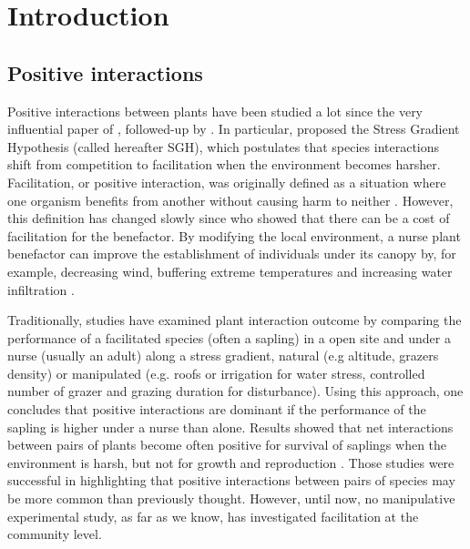 \documentclass[12pt]{article} %
\begin{document}


\section{Introduction}

\subsection{Positive interactions}
Positive interactions between plants have been studied a lot since the very influential paper of \citep{Bertness1994}, followed-up by \citep{Bruno2003}. In particular, \citet{Bertness1994} proposed the Stress Gradient Hypothesis (called hereafter SGH), which postulates that species interactions shift from competition to facilitation when the environment becomes harsher. Facilitation, or positive interaction, was originally defined as a situation where one organism benefits from another without causing harm to neither \citep{Bruno2003}. However, this definition has changed slowly since \citet{Schob2014} who showed that there can be a cost of facilitation for the benefactor.
By modifying the local environment, a nurse plant benefactor can improve the establishment of individuals under its canopy by, for example, decreasing wind, buffering extreme temperatures and increasing water infiltration \citep{Rietkerk1997}. 

Traditionally, studies have examined plant interaction outcome by comparing the performance of a facilitated species (often a sapling) in a open site and under a nurse (usually an adult) along a stress gradient, natural (e.g altitude, grazers density) or manipulated (e.g. roofs or irrigation for water stress, controlled number of grazer and grazing duration for disturbance).
Using this approach, one concludes that positive interactions are dominant if the performance of the sapling is higher under a nurse than alone. Results showed that net interactions between pairs of plants become often positive for survival of saplings when the environment is harsh, but not for growth and reproduction \citep{He2013}.
Those studies were successful in highlighting that positive interactions between pairs of species may be more common than previously thought. However, until now, no manipulative experimental study, as far as we know, has investigated facilitation at the community level. 
\end{document}
